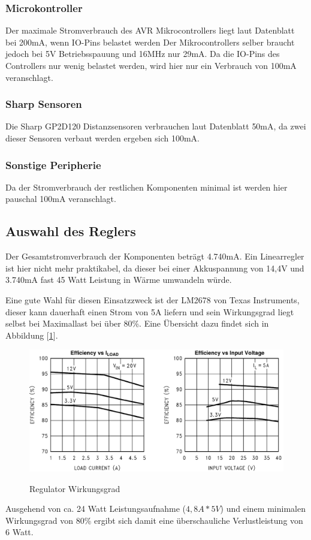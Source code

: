 

\subsubsection{Microkontroller}
Der maximale Stromverbrauch des AVR Mikrocontrollers liegt laut Datenblatt\cite{ds-at90can} bei 200mA, wenn IO-Pins belastet werden
Der Mikrocontrollers selber braucht jedoch bei 5V Betriebsspauung und 16MHz nur 29mA. Da die IO-Pins des Controllers nur wenig belastet werden,
wird hier nur ein Verbrauch von 100mA veranschlagt.

\subsubsection{Sharp Sensoren}
Die Sharp GP2D120 Distanzsensoren verbrauchen laut Datenblatt \cite{ds-sharp-GP2D120} 50mA, da zwei dieser Sensoren verbaut werden ergeben sich 100mA.

\subsubsection{Sonstige Peripherie}
Da der Stromverbrauch der restlichen Komponenten minimal ist werden hier pauschal 100mA veranschlagt.

\subsection{Auswahl des Reglers}
Der Gesamtstromverbrauch der Komponenten beträgt 4.740mA. Ein Linearregler ist hier nicht mehr praktikabel, da dieser bei einer Akkuspannung von 14,4V und 3.740mA fast 45 Watt Leistung in Wärme umwandeln würde.

Eine gute Wahl für diesen Einsatzzweck ist der LM2678 von Texas Instruments, dieser kann dauerhaft einen Strom von 5A liefern und sein Wirkungsgrad liegt selbst bei Maximallast bei über 80\%.
Eine Übersicht dazu findet sich in Abbildung [\ref{fig:vreg}].
\begin{figure}[H]
\centering
\includegraphics[width=.8\textwidth]{vreg.png}\\
\caption{Regulator Wirkungsgrad}%
\label{fig:vreg}
\end{figure}
Ausgehend von ca. 24 Watt Leistungsaufnahme ($4,8A*5V$) und einem minimalen Wirkungsgrad von 80\%  ergibt sich damit eine überschauliche Verlustleistung von 6 Watt.


